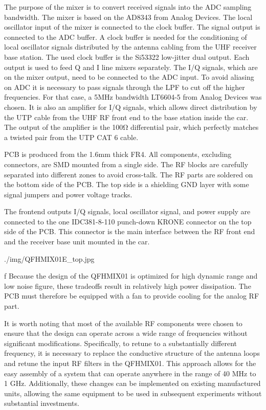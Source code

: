 The purpose of the mixer is to convert received signals into the ADC sampling bandwidth. The mixer is based on the AD8343 from Analog Devices. The local oscillator input of the mixer is connected to the clock buffer. The signal output is connected to the ADC buffer.
A clock buffer is needed for the conditioning of local oscillator signals distributed by the antenna cabling from the UHF receiver base station.  The used clock buffer is the Si53322 low-jitter dual output. Each output is used to feed Q and I line mixers separately.
The I/Q signals, which are on the mixer output, need to be connected to the ADC input. To avoid aliasing on ADC it is necessary to pass signals through the LPF to cut off the higher frequencies. For that case, a 5MHz bandwidth LT6604-5 from Analog Devices was chosen. It is also an amplifier for I/Q signals, which allows direct distribution by the UTP cable from the UHF RF front end to the base station inside the car. The output of the amplifier is the 100Ω differential pair, which perfectly matches a twisted pair from the UTP CAT 6 cable.

PCB is produced from the 1.6mm thick FR4. All components, excluding connectors, are SMD mounted from a single side. The RF blocks are carefully separated into different zones to avoid cross-talk. The RF parts are soldered on the bottom side of the PCB. The top side is a shielding GND layer with some signal jumpers and power voltage tracks.

The frontend outputs I/Q signals, local oscillator signal, and power supply are connected to the one IDC381-8-110 punch-down KRONE connector on the top side of the PCB. This connector is the main interface between the RF front end and the receiver base unit mounted in the car.

\medskip
{}
\picw=10cm \cinspic ./img/QFHMIX01E_top.jpg
\caption/f  Because the design of the QFHMIX01 is optimized for high dynamic range and low noise figure, these tradeoffs result in relatively high power dissipation. The PCB must therefore be equipped with a fan to provide cooling for the analog RF part.
\medskip

It is worth noting that most of the available RF components were chosen to ensure that the design can operate across a wide range of frequencies without significant modifications. Specifically, to retune to a substantially different frequency, it is necessary to replace the conductive structure of the antenna loops and retune the input RF filters in the QFHMIX01. This approach allows for the easy assembly of a system that can operate anywhere in the range of 40 MHz to 1 GHz. Additionally, these changes can be implemented on existing manufactured units, allowing the same equipment to be used in subsequent experiments without substantial investments.


